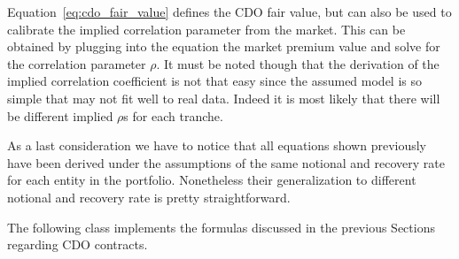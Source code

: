Equation~\ref{eq:cdo_fair_value} defines the CDO fair value, but can also be used to calibrate the implied correlation parameter from the market.
This can be obtained by plugging into the equation the market premium value and solve for the correlation parameter $\rho$.
It must be noted though that the derivation of the implied correlation coefficient is not that easy since the assumed model is so simple that may not fit well to real data. Indeed it is most likely that there will be different implied $\rho$s for each tranche.

As a last consideration we have to notice that all equations shown previously have been derived under the assumptions of the same notional and recovery rate for each entity in the portfolio. Nonetheless their generalization to different notional and recovery rate is pretty straightforward.
 
%

The following class implements the formulas discussed in the previous Sections regarding CDO contracts.

